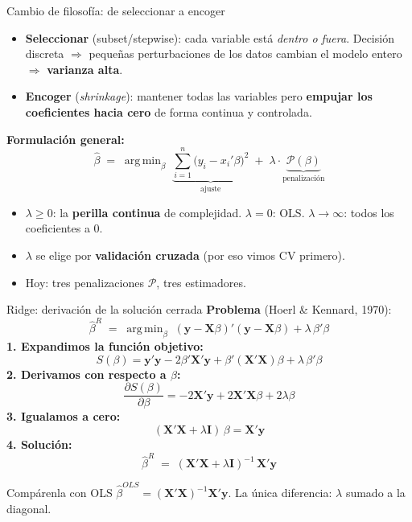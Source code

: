 \documentclass{beamer}
\newcommand{\1}{\mathbb{I}}
\DeclareMathOperator*{\argmin}{arg\,min}
\begin{document}
\begin{frame}{Cambio de filosofía: de seleccionar a encoger}
\small
\begin{itemize}\itemsep5pt
  \item \textbf{Seleccionar} (subset/stepwise): cada variable está \emph{dentro o fuera}. Decisión discreta $\Rightarrow$ pequeñas perturbaciones de los datos cambian el modelo entero $\Rightarrow$ \textbf{varianza alta}. \pause
  \item \textbf{Encoger} (\emph{shrinkage}): mantener todas las variables pero \textbf{empujar los coeficientes hacia cero} de forma continua y controlada. \pause
\end{itemize}

\vspace{0.2cm}
\textbf{Formulación general:}
\[ \hat{\beta} \;=\; \argmin_{\beta} \; \underbrace{\sum_{i=1}^n \big(y_i - x_i'\beta\big)^2}_{\text{ajuste}} \;+\; \lambda \cdot \underbrace{\mathcal{P}(\beta)}_{\text{penalización}} \]
\pause

\begin{itemize}\itemsep4pt
  \item $\lambda \geq 0$: la \textbf{perilla continua} de complejidad. $\lambda = 0$: OLS. $\lambda \to \infty$: todos los coeficientes a 0.
  \item $\lambda$ se elige por \textbf{validación cruzada} (por eso vimos CV primero).
  \item Hoy: tres penalizaciones $\mathcal{P}$, tres estimadores.
\end{itemize}
\end{frame}

\begin{frame}{Ridge: derivación de la solución cerrada}
\small
\textbf{Problema} (Hoerl \& Kennard, 1970):
\[ \hat{\beta}^{R} \;=\; \argmin_{\beta} \; (\mathbf{y} - \mathbf{X}\beta)'(\mathbf{y} - \mathbf{X}\beta) + \lambda\, \beta'\beta \]
\pause
\textbf{1. Expandimos la función objetivo:}
\[ S(\beta) = \mathbf{y}'\mathbf{y} - 2\beta'\mathbf{X}'\mathbf{y} + \beta'(\mathbf{X}'\mathbf{X})\beta + \lambda\,\beta'\beta \]
\pause
\textbf{2. Derivamos con respecto a $\beta$:}
\[ \frac{\partial S(\beta)}{\partial \beta} = -2\mathbf{X}'\mathbf{y} + 2\mathbf{X}'\mathbf{X}\beta + 2\lambda\beta \]
\pause
\textbf{3. Igualamos a cero:}
\[ (\mathbf{X}'\mathbf{X} + \lambda \mathbf{I})\,\beta = \mathbf{X}'\mathbf{y} \]
\pause
\textbf{4. Solución:}
\[ \hat{\beta}^{R} \;=\; (\mathbf{X}'\mathbf{X} + \lambda \mathbf{I})^{-1}\,\mathbf{X}'\mathbf{y} \]
\pause
\begin{block}{Compárenla con OLS}
$\hat{\beta}^{OLS} = (\mathbf{X}'\mathbf{X})^{-1}\mathbf{X}'\mathbf{y}$. La única diferencia: $\lambda$ sumado a la diagonal.
\end{block}
\end{frame}
\end{document}
